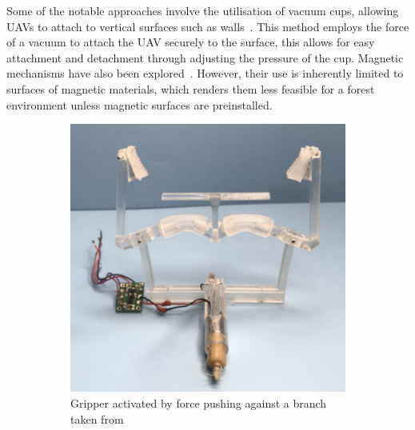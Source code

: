 Some of the notable approaches involve the utilisation of vacuum cups, allowing UAVs to attach to vertical surfaces such as walls~\cite{perching-vertical-surface}.
This method employs the force of a vacuum to attach the UAV securely to the surface, this allows for easy attachment and detachment through adjusting the pressure of the cup.
Magnetic mechanisms have also been explored~\cite{perching-magnets}.
However, their use is inherently limited to surfaces of magnetic materials, which renders them less feasible for a forest environment unless magnetic surfaces are preinstalled.

\begin{figure}[ht]
  \centering
  \begin{subfigure}[b]{0.45\textwidth}
      \centering
      \includegraphics[width=\textwidth]{background/perching-gripper1.png}
      \caption{Gripper activated by force pushing against a branch taken from~\cite{perching-gripper1}}
      \label{fig:perching-gripper1}
  \end{subfigure}
  \hfill
  \begin{subfigure}[b]{0.45\textwidth}
      \centering

\end{subfigure}
\end{figure}
